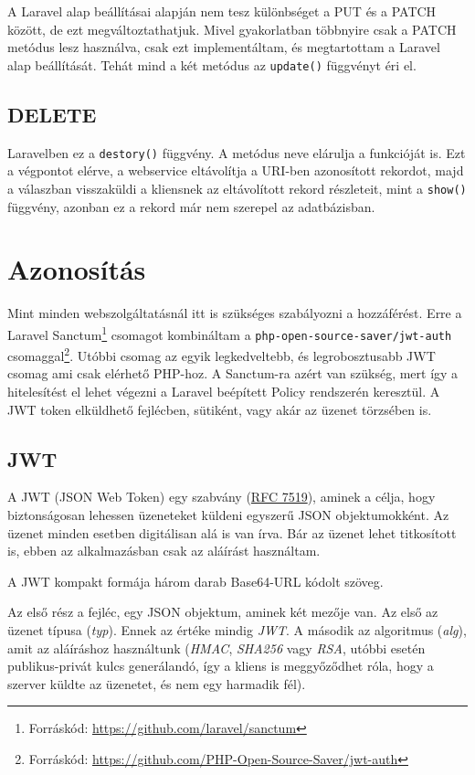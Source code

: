 \documentclass[a4paper,12pt]{thesis-ekf}
\theoremstyle{definition}
\begin{document}
				A Laravel alap beállításai alapján nem tesz különbséget a PUT és a PATCH között, de ezt megváltoztathatjuk. Mivel gyakorlatban többnyire csak a PATCH metódus lesz használva, csak ezt implementáltam, és megtartottam a Laravel alap beállítását. Tehát mind a két metódus az \verb|update()| függvényt éri el.
				
			\subsection{DELETE}
				Laravelben ez a \verb|destory()| függvény. A metódus neve elárulja a funkcióját is. Ezt a végpontot elérve, a webservice eltávolítja a URI-ben azonosított rekordot, majd a válaszban visszaküldi a kliensnek az eltávolított rekord részleteit, mint a \verb|show()| függvény, azonban ez a rekord már nem szerepel az adatbázisban.
		
		\section{Azonosítás}\label{sc-auth}
			Mint minden webszolgáltatásnál itt is szükséges szabályozni a hozzáférést. Erre a Laravel Sanctum\footnote{Forráskód: \url{https://github.com/laravel/sanctum}} csomagot kombináltam a \verb|php-open-source-saver/jwt-auth| csomaggal\footnote{Forráskód: \url{https://github.com/PHP-Open-Source-Saver/jwt-auth}}. Utóbbi csomag az egyik legkedveltebb, és legrobosztusabb JWT csomag ami csak elérhető PHP-hoz. A Sanctum-ra azért van szükség, mert így a hitelesítést el lehet végezni a Laravel beépített Policy rendszerén keresztül\cite{sanctum}. A JWT token elküldhető fejlécben, sütiként, vagy akár az üzenet törzsében is.
			
			\subsection{JWT}
			A JWT (JSON Web Token) egy szabvány (\href{https://tools.ietf.org/html/rfc7519}{RFC 7519}), aminek a célja, hogy biztonságosan lehessen üzeneteket küldeni egyszerű JSON objektumokként. Az üzenet minden esetben digitálisan alá is van írva. Bár az üzenet lehet titkosított is, ebben az alkalmazásban csak az aláírást használtam.\cite{jwt-intro}
			
			A JWT kompakt formája három darab Base64-URL kódolt szöveg. \cite{jwt-intro}
			
			Az első rész a fejléc, egy JSON objektum, aminek két mezője van. Az első az üzenet típusa (\emph{typ}). Ennek az értéke mindig \emph{JWT}. A második az algoritmus (\emph{alg}), amit az aláíráshoz használtunk (\emph{HMAC}, \emph{SHA256} vagy \emph{RSA}, utóbbi esetén publikus-privát kulcs generálandó, így a kliens is meggyőződhet róla, hogy a szerver küldte az üzenetet, és nem egy harmadik fél).\cite{jwt-handbook} 
			
\end{document}

